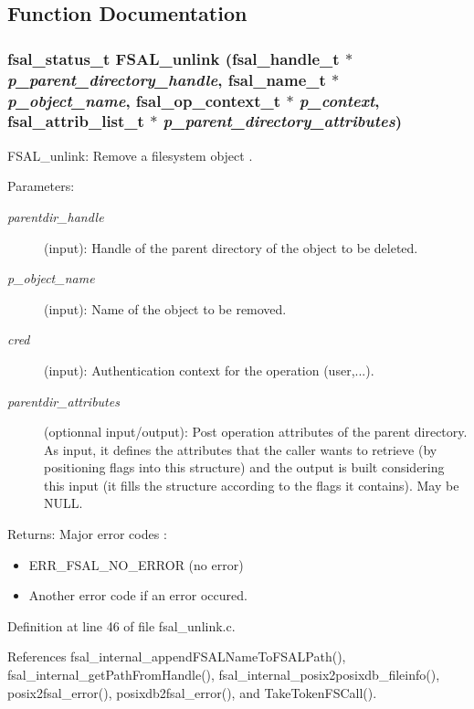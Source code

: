 \subsection{Function Documentation}
\subsubsection{\setlength{\rightskip}{0pt plus 5cm}fsal\_\-status\_\-t FSAL\_\-unlink (fsal\_\-handle\_\-t $\ast$ {\em p\_\-parent\_\-directory\_\-handle}, fsal\_\-name\_\-t $\ast$ {\em p\_\-object\_\-name}, fsal\_\-op\_\-context\_\-t $\ast$ {\em p\_\-context}, fsal\_\-attrib\_\-list\_\-t $\ast$ {\em p\_\-parent\_\-directory\_\-attributes})}\label{fsal__unlink_8c_a0}


FSAL\_\-unlink: Remove a filesystem object .

\begin{Desc}
\item[Parameters:]
\begin{description}
\item[{\em parentdir\_\-handle}](input): Handle of the parent directory of the object to be deleted. \item[{\em p\_\-object\_\-name}](input): Name of the object to be removed. \item[{\em cred}](input): Authentication context for the operation (user,...). \item[{\em parentdir\_\-attributes}](optionnal input/output): Post operation attributes of the parent directory. As input, it defines the attributes that the caller wants to retrieve (by positioning flags into this structure) and the output is built considering this input (it fills the structure according to the flags it contains). May be NULL.\end{description}
\end{Desc}
\begin{Desc}
\item[Returns:]Major error codes :\begin{itemize}
\item ERR\_\-FSAL\_\-NO\_\-ERROR (no error)\item Another error code if an error occured. \end{itemize}
\end{Desc}


Definition at line 46 of file fsal\_\-unlink.c.

References fsal\_\-internal\_\-append\-FSALName\-To\-FSALPath(), fsal\_\-internal\_\-get\-Path\-From\-Handle(), fsal\_\-internal\_\-posix2posixdb\_\-fileinfo(), posix2fsal\_\-error(), posixdb2fsal\_\-error(), and Take\-Token\-FSCall().